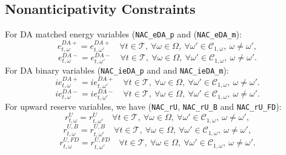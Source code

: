 \subsection{Nonanticipativity Constraints}
\label{SEC:NonanticipativityConstraints1}

For DA matched energy variables (\verb|NAC_eDA_p| and (\verb|NAC_eDA_m|):
\begin{equation} \label{EQ:NAC_eDA_p1}
	e^{DA+}_{t, \omega} = e^{DA+}_{t, \omega'} \quad \forall t \in \mathcal{T}, \ \forall \omega \in \Omega, \ \forall \omega' \in \mathcal{C}_{1, \omega}, \ \omega \neq \omega',
\end{equation}
\begin{equation} \label{EQ:NAC_eDA_m1}
	e^{DA-}_{t, \omega} = e^{DA-}_{t, \omega'} \quad \forall t \in \mathcal{T}, \ \forall \omega \in \Omega, \ \forall \omega' \in \mathcal{C}_{1, \omega} , \ \omega \neq \omega'.
\end{equation}
For DA binary variables (\verb|NAC_ieDA_p| and and \verb|NAC_ieDA_m|):
\begin{equation} \label{EQ:NAC_ieDA_p1}
	ie^{DA+}_{t, \omega} = ie^{DA+}_{t, \omega'} \quad \forall t \in \mathcal{T}, \ \forall \omega \in \Omega, \ \forall \omega' \in \mathcal{C}_{1, \omega} , \ \omega \neq \omega'.
\end{equation}
\begin{equation} \label{EQ:NAC_ieDA_m1}
	ie^{DA-}_{t, \omega} = ie^{DA-}_{t, \omega'} \quad \forall t \in \mathcal{T}, \ \forall \omega \in \Omega, \ \forall \omega' \in \mathcal{C}_{1, \omega} , \ \omega \neq \omega'.
\end{equation}
For upward reserve variables, we have (\verb|NAC_rU|, \verb|NAC_rU_B| and \verb|NAC_rU_FD|):
\begin{equation} \label{EQ:NAC_pVRU1}
	r^U_{t, \omega} = r^U_{t, \omega'} \quad \forall t \in \mathcal{T}, \ \forall \omega \in \Omega, \ \forall \omega' \in \mathcal{C}_{1, \omega}, \ \omega \neq \omega',
\end{equation}
\begin{equation} \label{EQ:NAC_rUB1}
	r^{U, B}_{t, \omega} = r^{U, B}_{t, \omega'} \quad \forall t \in \mathcal{T}, \ \forall \omega \in \Omega, \ \forall \omega' \in \mathcal{C}_{1, \omega}, \ \omega \neq \omega',
\end{equation}
\begin{equation} \label{EQ:NAC_rUFD1}
	r^{U, FD}_{t, \omega} = r^{U, FD}_{t, \omega'} \quad \forall t \in \mathcal{T}, \ \forall \omega \in \Omega, \ \forall \omega' \in \mathcal{C}_{1, \omega}, \ \omega \neq \omega'.
\end{equation}

